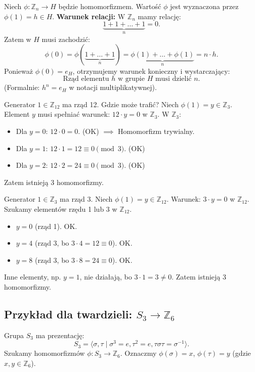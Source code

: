 Niech $\phi: \mathbb{Z}_n \to H$ będzie homomorfizmem.
Wartość $\phi$ jest wyznaczona przez $\phi(1) = h \in H$.
\textbf{Warunek relacji:}
W $\mathbb{Z}_n$ mamy relację:
\[ \underbrace{1 + 1 + \dots + 1}_{n} = 0. \]
Zatem w $H$ musi zachodzić:
\[ \phi(0) = \phi(\underbrace{1 + \dots + 1}_{n}) = \underbrace{\phi(1) + \dots + \phi(1)}_{n} = n \cdot h. \]
Ponieważ $\phi(0) = e_H$, otrzymujemy warunek konieczny i wystarczający:
\[ \text{Rząd elementu } h \text{ w grupie } H \text{ musi dzielić } n. \]
(Formalnie: $h^n = e_H$ w notacji multiplikatywnej).

\begin{eg}
Generator $1 \in \mathbb{Z}_{12}$ ma rząd 12. Gdzie może trafić?
Niech $\phi(1) = y \in \mathbb{Z}_3$. Element $y$ musi spełniać warunek: $12 \cdot y = 0$ w $\mathbb{Z}_3$.
W $\mathbb{Z}_3$:
\begin{itemize}
    \item Dla $y=0$: $12 \cdot 0 = 0$. (OK) $\implies$ Homomorfizm trywialny.
    \item Dla $y=1$: $12 \cdot 1 = 12 \equiv 0 \pmod 3$. (OK)
    \item Dla $y=2$: $12 \cdot 2 = 24 \equiv 0 \pmod 3$. (OK)
\end{itemize}
Zatem istnieją 3 homomorfizmy.
\end{eg}

\begin{eg}
Generator $1 \in \mathbb{Z}_3$ ma rząd 3. Niech $\phi(1) = y \in \mathbb{Z}_{12}$.
Warunek: $3 \cdot y = 0$ w $\mathbb{Z}_{12}$.
Szukamy elementów rzędu 1 lub 3 w $\mathbb{Z}_{12}$.
\begin{itemize}
    \item $y=0$ (rząd 1). OK.
    \item $y=4$ (rząd 3, bo $3 \cdot 4 = 12 \equiv 0$). OK.
    \item $y=8$ (rząd 3, bo $3 \cdot 8 = 24 \equiv 0$). OK.
\end{itemize}
Inne elementy, np. $y=1$, nie działają, bo $3 \cdot 1 = 3 \neq 0$.
Zatem istnieją 3 homomorfizmy.
\end{eg}

\subsection{Przykład dla twardzieli: $S_3 \to \mathbb{Z}_6$}

Grupa $S_3$ ma prezentację:
\[ S_3 = \langle \sigma, \tau \mid \sigma^3 = e, \tau^2 = e, \tau\sigma\tau = \sigma^{-1} \rangle. \]
Szukamy homomorfizmów $\phi: S_3 \to \mathbb{Z}_6$.
Oznaczmy $\phi(\sigma) = x$, $\phi(\tau) = y$ (gdzie $x, y \in \mathbb{Z}_6$).

